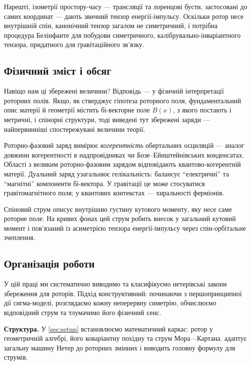 \documentclass[11pt,a4paper]{article}
\numberwithin{equation}{section}
\theoremstyle{plain}
\theoremstyle{definition}
\theoremstyle{remark}
\begin{document}
Нарешті, ізометрії простору-часу — трансляції та лоренцові бусти, застосовані до самих координат — дають звичний тензор енергії-імпульсу. Оскільки ротор несе внутрішній спін, канонічний тензор загалом не симетричний, і потрібна процедура Белінфанте для побудови симетричного, калібрувально-інваріантного тензора, придатного для гравітаційного зв’язку.

\subsection{Фізичний зміст і обсяг}

Навіщо нам ці збережені величини? Відповідь — у фізичній інтерпретації роторних полів. Якщо, як стверджує гіпотеза роторного поля, фундаментальний опис матерії й геометрії містить бі-векторне поле $B(x)$, з якого постають і метричні, і спінорні структури, тоді виведені тут збережені заряди — найпервинніші спостережувані величини теорії.

Роторно-фазовий заряд вимірює \emph{когерентність} обертальних осциляцій — аналог довжини когерентності в надпровідниках чи Бозе–Ейнштейнівських конденсатах. Області з великим роторно-фазовим зарядом відповідають квантово-когерентній матерії. Дуальний заряд узагальнює гелікальність: балансує “електричні” та “магнітні” компоненти бі-вектора. У гравітації це може стосуватися гравітомагнітного поля; у квантових контекстах — хиральності ферміонів.

Спіновий струм описує внутрішню густину кутового моменту, яку несе саме роторне поле. На кривих фонах цей струм робить внесок у загальний кутовий момент і пов’язаний із асиметрією тензора енергії-імпульсу через спін-орбітальне зчеплення.

\subsection{Організація роботи}

У цій праці ми систематично виводимо та класифікуємо нетерівські закони збереження для роторів. Підхід конструктивний: починаючи з першопринципної дії сигма-моделі, розглядаємо кожну неперервну симетрію, обчислюємо відповідний струм та тлумачимо його фізичний сенс.

\textbf{Структура.} У \cref{sec:setup} встановлюємо математичний каркас: ротор у геометричній алгебрі, його коваріантну похідну та струм Мора—Картана.  адаптує загальну машину Нетер до роторних змінних і виводить головну формулу для струмів.
\end{document}
